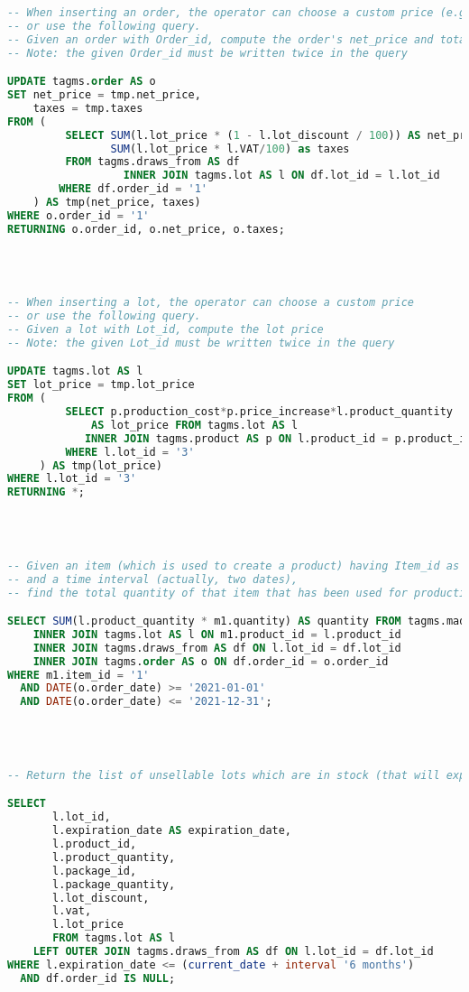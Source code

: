 \begin{lstlisting}[language=SQL,
keywordstyle=\color{blue},
stringstyle=\color{mauve},
showstringspaces=false,
breaklines=true,
basicstyle=\ttfamily\footnotesize]
-- When inserting an order, the operator can choose a custom price (e.g., decided with the customer)
-- or use the following query.
-- Given an order with Order_id, compute the order's net_price and total taxes.
-- Note: the given Order_id must be written twice in the query

UPDATE tagms.order AS o
SET net_price = tmp.net_price,
    taxes = tmp.taxes
FROM (
         SELECT SUM(l.lot_price * (1 - l.lot_discount / 100)) AS net_price,
                SUM(l.lot_price * l.VAT/100) as taxes
         FROM tagms.draws_from AS df
                  INNER JOIN tagms.lot AS l ON df.lot_id = l.lot_id
        WHERE df.order_id = '1'
    ) AS tmp(net_price, taxes)
WHERE o.order_id = '1'
RETURNING o.order_id, o.net_price, o.taxes;




-- When inserting a lot, the operator can choose a custom price
-- or use the following query.
-- Given a lot with Lot_id, compute the lot price
-- Note: the given Lot_id must be written twice in the query

UPDATE tagms.lot AS l
SET lot_price = tmp.lot_price
FROM (
         SELECT p.production_cost*p.price_increase*l.product_quantity
             AS lot_price FROM tagms.lot AS l
            INNER JOIN tagms.product AS p ON l.product_id = p.product_id
         WHERE l.lot_id = '3'
     ) AS tmp(lot_price)
WHERE l.lot_id = '3'
RETURNING *;




-- Given an item (which is used to create a product) having Item_id as identifier
-- and a time interval (actually, two dates),
-- find the total quantity of that item that has been used for production or packaging during that time.

SELECT SUM(l.product_quantity * m1.quantity) AS quantity FROM tagms.made_up_of_1 AS m1
    INNER JOIN tagms.lot AS l ON m1.product_id = l.product_id
    INNER JOIN tagms.draws_from AS df ON l.lot_id = df.lot_id
    INNER JOIN tagms.order AS o ON df.order_id = o.order_id
WHERE m1.item_id = '1'
  AND DATE(o.order_date) >= '2021-01-01'
  AND DATE(o.order_date) <= '2021-12-31';




-- Return the list of unsellable lots which are in stock (that will expire in less than 6 months)

SELECT
       l.lot_id,
       l.expiration_date AS expiration_date,
       l.product_id,
       l.product_quantity,
       l.package_id,
       l.package_quantity,
       l.lot_discount,
       l.vat,
       l.lot_price
       FROM tagms.lot AS l
    LEFT OUTER JOIN tagms.draws_from AS df ON l.lot_id = df.lot_id
WHERE l.expiration_date <= (current_date + interval '6 months')
  AND df.order_id IS NULL;




\end{lstlisting}
